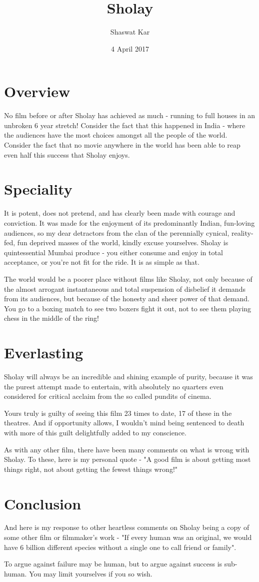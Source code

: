 \documentclass[a4paper,12pt]{article}
\title{Sholay}
\author{Shaswat Kar }
\date{4 April 2017}
\begin{document}
\section{Overview}

No film before or after Sholay has achieved as much - running to full houses in an unbroken 6 year stretch! Consider the fact that this happened in India - where the audiences have the most choices amongst all the people of the world. Consider the fact that no movie anywhere in the world has been able to reap even half this success that Sholay enjoys.

\section{Speciality}

It is potent, does not pretend, and has clearly been made with courage and conviction. It was made for the enjoyment of its predominantly Indian, fun-loving audiences, so my dear detractors from the clan of the perennially cynical, reality-fed, fun deprived masses of the world, kindly excuse yourselves. Sholay is quintessential Mumbai produce - you either consume and enjoy in total acceptance, or you're not fit for the ride. It is as simple as that.

The world would be a poorer place without films like Sholay, not only because of the almost arrogant instantaneous and total suspension of disbelief it demands from its audiences, but because of the honesty and sheer power of that demand. You go to a boxing match to see two boxers fight it out, not to see them playing chess in the middle of the ring!

\section{Everlasting}

Sholay will always be an incredible and shining example of purity, because it was the purest attempt made to entertain, with absolutely no quarters even considered for critical acclaim from the so called pundits of cinema.

Yours truly is guilty of seeing this film 23 times to date, 17 of these in the theatres. And if opportunity allows, I wouldn't mind being sentenced to death with more of this guilt delightfully added to my conscience.

As with any other film, there have been many comments on what is wrong with Sholay. To these, here is my personal quote - "A good film is about getting most things right, not about getting the fewest things wrong!"

\section{Conclusion}

And here is my response to other heartless comments on Sholay being a copy of some other film or filmmaker's work - "If every human was an original, we would have 6 billion different species without a single one to call friend or family".

To argue against failure may be human, but to argue against success is sub-human. You may limit yourselves if you so wish.
\end{document}
